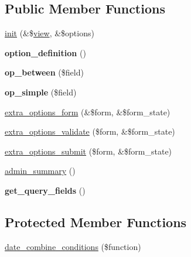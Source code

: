 \subsection*{Public Member Functions}
\begin{DoxyCompactItemize}
\item 
\hyperlink{classdate__views__filter__handler_adaa0b2cd0664c75f987af0b79386a3b7}{init} (\&\$\hyperlink{classview}{view}, \&\$options)
\item 
\hypertarget{classdate__views__filter__handler_a478d567db72681bd8ce6eefc93ce03f4}{
{\bfseries option\_\-definition} ()}
\label{classdate__views__filter__handler_a478d567db72681bd8ce6eefc93ce03f4}

\item 
\hypertarget{classdate__views__filter__handler_a088c5e7b185905ab1a079e3143d15ea8}{
{\bfseries op\_\-between} (\$field)}
\label{classdate__views__filter__handler_a088c5e7b185905ab1a079e3143d15ea8}

\item 
\hypertarget{classdate__views__filter__handler_af82bf139ea3701ef72b79766c47efa87}{
{\bfseries op\_\-simple} (\$field)}
\label{classdate__views__filter__handler_af82bf139ea3701ef72b79766c47efa87}

\item 
\hyperlink{classdate__views__filter__handler_a17b0b4b30f8c2bcb368bbb6fd9eabcd1}{extra\_\-options\_\-form} (\&\$form, \&\$form\_\-state)
\item 
\hyperlink{classdate__views__filter__handler_af9d27a5bd6a2c0fe3c81327daf5ef45e}{extra\_\-options\_\-validate} (\$form, \&\$form\_\-state)
\item 
\hyperlink{classdate__views__filter__handler_af1326072f8c40f95d86d680d52bba8b4}{extra\_\-options\_\-submit} (\$form, \&\$form\_\-state)
\item 
\hyperlink{classdate__views__filter__handler_a214c46a8a095cad6ac6159cbedbb4f35}{admin\_\-summary} ()
\item 
\hypertarget{classdate__views__filter__handler_a74065da7ab2fe600bfa4e06ebdad87bb}{
{\bfseries get\_\-query\_\-fields} ()}
\label{classdate__views__filter__handler_a74065da7ab2fe600bfa4e06ebdad87bb}

\end{DoxyCompactItemize}
\subsection*{Protected Member Functions}
\begin{DoxyCompactItemize}
\item 
\hyperlink{classdate__views__filter__handler_a130779ebea594cff22728f1088ebbc5e}{date\_\-combine\_\-conditions} (\$function)
\end{DoxyCompactItemize}


